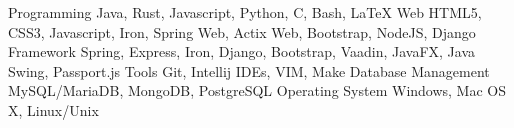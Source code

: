 \begin{cvskills}
	\cvskill
	  {Programming}
	  {Java, Rust, Javascript, Python, C, Bash, LaTeX}
	\cvskill
	  {Web}
	  {HTML5, CSS3, Javascript, Iron, Spring Web, Actix Web, Bootstrap, NodeJS, Django}
	\cvskill
	  {Framework}
	  {Spring, Express, Iron, Django, Bootstrap, Vaadin, JavaFX, Java Swing, Passport.js}
	\cvskill
	  {Tools}
	  {Git, Intellij IDEs, VIM, Make}
	\cvskill
	  {Database Management}
	  {MySQL/MariaDB, MongoDB, PostgreSQL}
	\cvskill
	  {Operating System}
	  {Windows, Mac OS X, Linux/Unix}
\end{cvskills}
